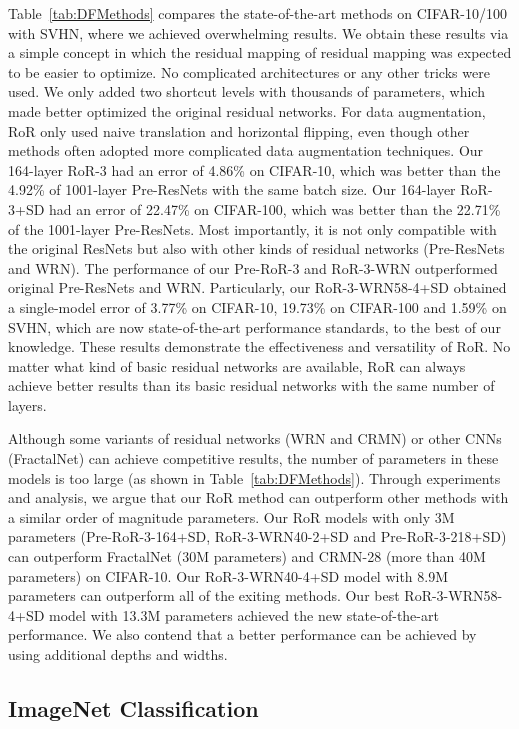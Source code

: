 \documentclass[journal]{IEEEtran}
\begin{document}
Table~\ref{tab:DFMethods} compares the state-of-the-art methods on CIFAR-10/100 with SVHN, where we achieved overwhelming results. We obtain these results via a simple concept in which the residual mapping of residual mapping was expected to be easier to optimize. No complicated architectures or any other tricks were used. We only added two shortcut levels with thousands of parameters, which made better optimized the original residual networks. For data augmentation, RoR only used naive translation and horizontal flipping, even though other methods often adopted more complicated data augmentation techniques. Our 164-layer RoR-3 had an error of 4.86\% on CIFAR-10, which was better than the 4.92\% of 1001-layer Pre-ResNets with the same batch size. Our 164-layer RoR-3+SD had an error of 22.47\% on CIFAR-100, which was better than the 22.71\% of the 1001-layer Pre-ResNets. Most importantly, it is not only compatible with the original ResNets but also with other kinds of residual networks (Pre-ResNets and WRN). The performance of our Pre-RoR-3 and RoR-3-WRN outperformed original Pre-ResNets and WRN. Particularly, our RoR-3-WRN58-4+SD obtained a single-model error of 3.77\% on CIFAR-10, 19.73\% on CIFAR-100 and 1.59\% on SVHN, which are now state-of-the-art performance standards, to the best of our knowledge. These results demonstrate the effectiveness and versatility of RoR. No matter what kind of basic residual networks are available, RoR can always achieve better results than its basic residual networks with the same number of layers.

\par 
Although some variants of residual networks (WRN and CRMN) or other CNNs (FractalNet) can achieve competitive results, the number of parameters in these models is too large (as shown in Table~\ref{tab:DFMethods}). Through experiments and analysis, we argue that our RoR method can outperform other methods with a similar order of magnitude parameters. Our RoR models with only 3M parameters (Pre-RoR-3-164+SD, RoR-3-WRN40-2+SD and Pre-RoR-3-218+SD) can outperform FractalNet (30M parameters) and CRMN-28 (more than 40M parameters) on CIFAR-10. Our RoR-3-WRN40-4+SD model with 8.9M parameters can outperform all of the exiting methods. Our best RoR-3-WRN58-4+SD model with 13.3M parameters achieved the new state-of-the-art performance. We also contend that a better performance can be achieved by using additional depths and widths.

\subsection{ImageNet Classification}
\end{document}
